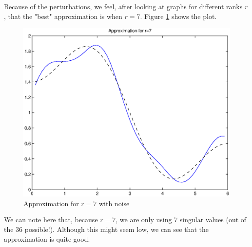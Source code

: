 Because of the perturbations, we feel, after looking at graphs for different ranks $r$, that the "best" approximation is when $r=7$. Figure \ref{rank7} shows the plot.

\begin{figure}
\begin{center}
\includegraphics[scale=0.7]{rank7.eps}
\caption{Approximation for $r=7$ with noise}
\label{rank7}
\end{center}
\end{figure} 

We can note here that, because $r=7$, we are only using 7 singular values (out of the 36 possible!). Although this might seem low, we can see that the approximation is quite good.